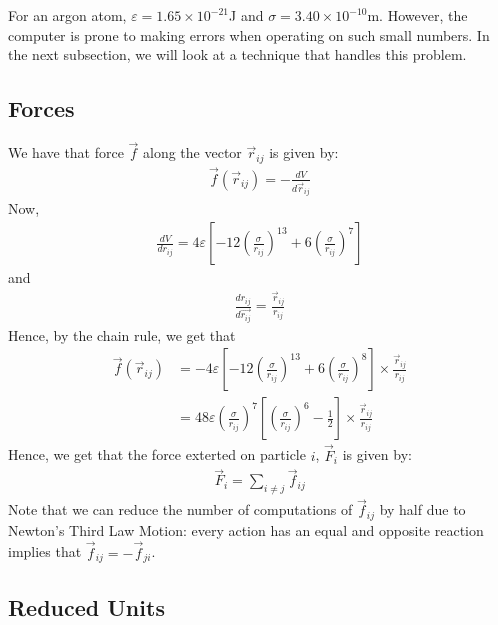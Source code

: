\documentclass[../Main.tex]{subfiles}
\begin{document}
For an argon atom, $\varepsilon = 1.65 \times 10^{-21}$J and $\sigma = 3.40 \times 10^{-10}$m. However, the computer is prone to making errors when operating on such small numbers. In the next subsection, we will look at a technique that handles this problem.

\subsection{Forces}

We have that force $\vec{f}$ along the vector $\vec{r}_{ij}$ is given by:
\begin{align*}
\vec{f}\left(\vec{r}_{ij}\right) = -\frac{dV}{d\vec{r}_{ij}}
\end{align*}
Now,
\begin{align*}
\frac{dV}{dr_{ij}} = 4\varepsilon \left[ -12\left( \frac{\sigma}{r_{ij}}\right)^{13} + 6\left( \frac{\sigma}{r_{ij}}\right)^{7}\right]
\end{align*}
and
\begin{align*}
\frac{dr_{ij}}{d\vec{r_{ij}}} = \frac{\vec{r}_{ij}}{r_{ij}}
\end{align*}
Hence, by the chain rule, we get that
\begin{align}
\vec{f}\left(\vec{r}_{ij}\right) & = -4\varepsilon \left[ -12\left( \frac{\sigma}{r_{ij}}\right)^{13} + 6\left( \frac{\sigma}{r_{ij}}\right)^{8}\right] \times \frac{\vec{r}_{ij}}{r_{ij}} \nonumber \\
& = 48\varepsilon \left( \frac{\sigma}{r_{ij}}\right)^{7} \left[ \left( \frac{\sigma}{r_{ij}}\right)^{6} - \frac{1}{2}\right] \times \frac{\vec{r}_{ij}}{r_{ij}} \label{eqn:lennard-jones_force_one_atom}
\end{align}
Hence, we get that the force exterted on particle $i$, $\vec{F}_{i}$ is given by:
\begin{align*}
	\vec{F}_{i} = \sum_{i \neq j} \vec{f}_{ij}
\end{align*}
Note that we can reduce the number of computations of $\vec{f}_{ij}$ by half due to Newton's Third Law Motion: every action has an equal and opposite reaction implies that $\vec{f}_{ij} = -\vec{f}_{ji}$.

\subsection{Reduced Units}
\end{document}
